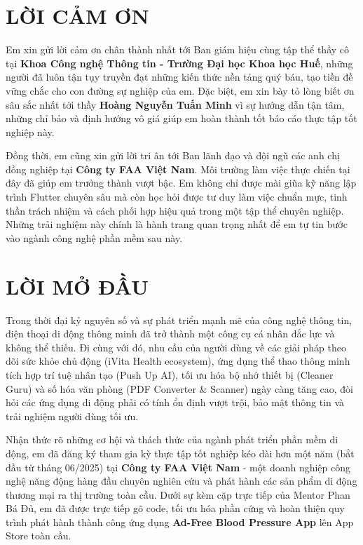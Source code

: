 \documentclass[12pt, a4paper]{article}
\begin{document}
\newpage

\section*{LỜI CẢM ƠN}
Em xin gửi lời cảm ơn chân thành nhất tới Ban giám hiệu cùng tập thể thầy cô tại \textbf{Khoa Công nghệ Thông tin - Trường Đại học Khoa học Huế}, những người đã luôn tận tụy truyền đạt những kiến thức nền tảng quý báu, tạo tiền đề vững chắc cho con đường sự nghiệp của em. Đặc biệt, em xin bày tỏ lòng biết ơn sâu sắc nhất tới thầy \textbf{Hoàng Nguyễn Tuấn Minh} vì sự hướng dẫn tận tâm, những chỉ bảo và định hướng vô giá giúp em hoàn thành tốt báo cáo thực tập tốt nghiệp này.

Đồng thời, em cũng xin gửi lời tri ân tới Ban lãnh đạo và đội ngũ các anh chị đồng nghiệp tại \textbf{Công ty FAA Việt Nam}. Môi trường làm việc thực chiến tại đây đã giúp em trưởng thành vượt bậc. Em không chỉ được mài giũa kỹ năng lập trình Flutter chuyên sâu mà còn học hỏi được tư duy làm việc chuẩn mực, tinh thần trách nhiệm và cách phối hợp hiệu quả trong một tập thể chuyên nghiệp. Những trải nghiệm này chính là hành trang quan trọng nhất để em tự tin bước vào ngành công nghệ phần mềm sau này.

\newpage

\section*{LỜI MỞ ĐẦU}

Trong thời đại kỷ nguyên số và sự phát triển mạnh mẽ của công nghệ thông tin, điện thoại di động thông minh đã trở thành một công cụ cá nhân đắc lực và không thể thiếu. Đi cùng với đó, nhu cầu của người dùng về các giải pháp theo dõi sức khỏe chủ động (iVita Health ecosystem), ứng dụng thể thao thông minh tích hợp trí tuệ nhân tạo (Push Up AI), tối ưu hóa bộ nhớ thiết bị (Cleaner Guru) và số hóa văn phòng (PDF Converter \& Scanner) ngày càng tăng cao, đòi hỏi các ứng dụng di động phải có tính ổn định vượt trội, bảo mật thông tin và trải nghiệm người dùng tối ưu.

Nhận thức rõ những cơ hội và thách thức của ngành phát triển phần mềm di động, em đã đăng ký tham gia kỳ thực tập tốt nghiệp kéo dài hơn một năm (bắt đầu từ tháng 06/2025) tại \textbf{Công ty FAA Việt Nam} - một doanh nghiệp công nghệ năng động hàng đầu chuyên nghiên cứu và phát hành các sản phẩm di động thương mại ra thị trường toàn cầu. Dưới sự kèm cặp trực tiếp của Mentor Phan Bá Đủ, em đã được trực tiếp gõ code, tối ưu hóa phần cứng và hoàn thiện quy trình phát hành thành công ứng dụng \textbf{Ad-Free Blood Pressure App} lên App Store toàn cầu.
\end{document}
